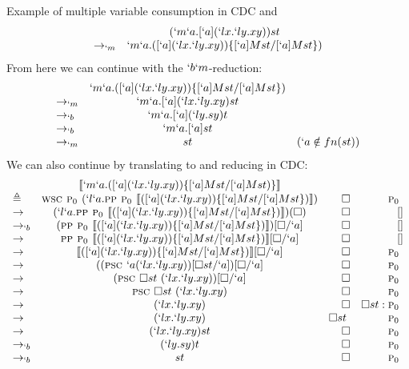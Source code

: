 \begin{example}{Example of multiple variable consumption in CDC and \lmu}
\[
\begin{array}{lcrr}
         & (`m`a.[`a](`lx.`ly.xy))st \\
\to_{`m} & `m`a.([`a](`lx.`ly.xy))\{[`a]Mst/[`a]Mst\}) \\
\end{array}
\]
From here we can continue with the $`b`m$-reduction:
\[
\begin{array}{lcrr}
         & `m`a.([`a](`lx.`ly.xy))\{[`a]Mst/[`a]Mst\}) \\
\to_{`m} & `m`a.[`a](`lx.`ly.xy)st \\
\to_{`b} & `m`a.[`a](`ly.sy)t \\
\to_{`b} & `m`a.[`a]st \\
\to_{`m} & st & (`a \notin fn(st)) \\
\end{array}
\]
We can also continue by translating to and reducing in CDC:
{
\[
\begin{array}{lcrr}
           & \llbracket `m`a.([`a](`lx.`ly.xy))\{[`a]Mst/[`a]Mst)\} \rrbracket \\
\triangleq & \textsc{wsc } \textsc{p$_0$ } (`l`a.\textsc{pp } \textsc{p$_0$ } \llbracket ([`a](`lx.`ly.xy))\{[`a]Mst/[`a]Mst\}) \rrbracket) & \square & \textsc{p$_0$ } \\
\to        & (`l`a.\textsc{pp } \textsc{p$_0$ } \llbracket ([`a](`lx.`ly.xy))\{[`a]Mst/[`a]Mst\}) \rrbracket)(\square) & \square & [] \\
\to_{`b}   & (\textsc{pp } \textsc{p$_0$ } \llbracket ([`a](`lx.`ly.xy))\{[`a]Mst/[`a]Mst\}) \rrbracket)[\square/`a] & \square & [] \\
\to        & \textsc{pp } \textsc{p$_0$ } \llbracket ([`a](`lx.`ly.xy))\{[`a]Mst/[`a]Mst\}) \rrbracket[\square/`a] & \square & [] \\
\to        & \llbracket ([`a](`lx.`ly.xy))\{[`a]Mst/[`a]Mst\}) \rrbracket[\square/`a] & \square & \textsc{p$_0$ } \\
\to        & ((\textsc{psc } `a (`lx.`ly.xy))[\square st/`a])[\square/`a] & \square & \textsc{p$_0$ } \\
\to        & (\textsc{psc } \square st\ (`lx.`ly.xy))[\square/`a] & \square & \textsc{p$_0$ } \\
\to        & \textsc{psc } \square st\ (`lx.`ly.xy) & \square & \textsc{p$_0$ } \\
\to        & (`lx.`ly.xy)   & \square & \square st:\textsc{p$_0$ } \\
\to        & (`lx.`ly.xy)   & \square st\ & \textsc{p$_0$ } \\
\to        & (`lx.`ly.xy)st & \square & \textsc{p$_0$ } \\
\to_{`b}   & (`ly.sy)t & \square & \textsc{p$_0$ } \\
\to_{`b}   & st & \square & \textsc{p$_0$ } \\
\end{array}
\]
}
\end{example}


